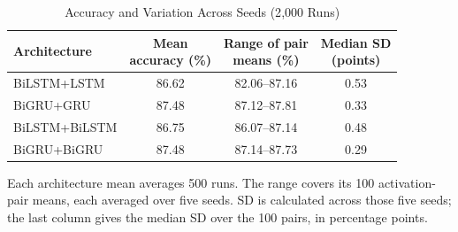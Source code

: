 \begin{table}[htbp]
  \caption{Accuracy and Variation Across Seeds (2{,}000 Runs)}
  \label{tab:sweep_summary}
  \centering\footnotesize
  \setlength{\tabcolsep}{3pt}
  \renewcommand{\arraystretch}{1.1}
  \begin{tabular}{@{}lccc@{}}
    \toprule
    Architecture & \shortstack{Mean\\accuracy (\%)}
    & \shortstack{Range of pair\\means (\%)}
    & \shortstack{Median SD\\(points)} \\
    \midrule
    BiLSTM+LSTM   & 86.62 & 82.06--87.16 & 0.53 \\
    BiGRU+GRU     & 87.48 & 87.12--87.81 & 0.33 \\
    BiLSTM+BiLSTM & 86.75 & 86.07--87.14 & 0.48 \\
    BiGRU+BiGRU   & 87.48 & 87.14--87.73 & 0.29 \\
    \bottomrule
  \end{tabular}

  \vspace{4pt}
  \parbox{\columnwidth}{\scriptsize
    Each architecture mean averages 500 runs. The range covers
    its 100 activation-pair means, each averaged over five
    seeds. SD is calculated across those five seeds; the last
    column gives the median SD over the 100 pairs, in
    percentage points.
  }
\end{table}